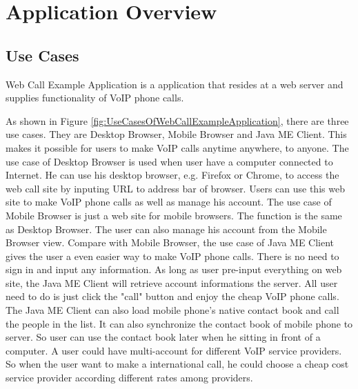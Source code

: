 
\chapter{Application Overview}
\label{sec:ApplicationOverview}

\section{Use Cases}

Web Call Example Application is a application that resides at a web server and supplies functionality of VoIP phone calls.

As shown in Figure \ref{fig:UseCasesOfWebCallExampleApplication}, there are three use cases. They are Desktop Browser, Mobile Browser and Java ME Client. This makes it possible for users to make VoIP calls anytime anywhere, to anyone. The use case of Desktop Browser is used when user have a computer connected to Internet. He can use his desktop browser, e.g. Firefox or Chrome, to access the web call site by inputing URL to address bar of browser. Users can use this web site to make VoIP phone calls as well as manage his account. The use case of Mobile Browser is just a web site for mobile browsers. The function is the same as Desktop Browser. The user can also manage his account from the Mobile Browser view. Compare with Mobile Browser, the use case of Java ME Client gives the user a even easier way to make VoIP phone calls. There is no need to sign in and input any information. As long as user pre-input everything on web site, the Java ME Client will retrieve account informations the server. All user need to do is just click the "call" button and enjoy the cheap VoIP phone calls. The Java ME Client can also load mobile phone's native contact book and call the people in the list. It can also synchronize the contact book of mobile phone to server. So user can use the contact book later when he sitting in front of a computer. A user could have multi-account for different VoIP service providers. So when the user want to make a international call, he could choose a cheap cost service provider according different rates among providers.

\begin{sidewaysfigure}
\centering
{}
\caption{Use Cases of Web Call Example Application}
\label{fig:UseCasesOfWebCallExampleApplication}
\end{sidewaysfigure}


